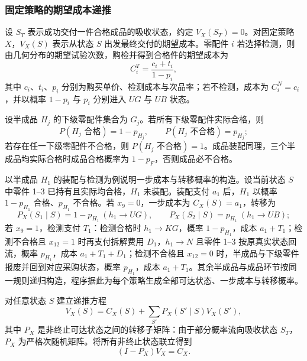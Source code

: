 \subsubsection{固定策略的期望成本递推}

设 $S_T$ 表示成功交付一件合格成品的吸收状态，约定 $V_X(S_T)=0$。对固定策略 $X$，$V_X(S)$ 表示从状态 $S$ 出发最终交付的期望成本。零配件 $i$ 若选择检测，则由几何分布的期望试验次数，购检并得到合格件的期望成本为
\begin{equation}
  C_i^{T}=\frac{c_i+t_i}{1-p_i},
  \label{eq:q3-buy-test}
\end{equation}
其中 $c_i$、$t_i$、$p_i$ 分别为购买单价、检测成本与次品率；若不检测，成本为 $C_i^{N}=c_i$，并以概率 $1-p_i$ 与 $p_i$ 分别进入 $UG$ 与 $UB$ 状态。

设半成品 $H_j$ 的下级零配件集合为 $G_j$。若所有下级零配件实际合格，则
\begin{equation}
  P(H_j\text{ 合格})=1-p_{H_j},\qquad
  P(H_j\text{ 不合格})=p_{H_j};
  \label{eq:q3-semi-quality}
\end{equation}
若存在任一下级零配件不合格，则 $P(H_j\text{ 不合格})=1$。成品装配同理，三个半成品均实际合格时成品合格概率为 $1-p_F$，否则成品必不合格。

以半成品 $H_1$ 的装配与检测为例说明一步成本与转移概率的构造。设当前状态 $S$ 中零件 1--3 已持有且实际均合格，$H_1$ 未装配。装配支付 $a_1$ 后，$H_1$ 以概率 $1-p_{H_1}$ 合格、$p_{H_1}$ 不合格。若 $x_9=0$，一步成本为 $C_X(S)=a_1$，转移为
\begin{equation}
  P_X(S_1\mid S)=1-p_{H_1}\ (h_1\to UG),\qquad
  P_X(S_2\mid S)=p_{H_1}\ (h_1\to UB);
  \label{eq:q3-example-notest}
\end{equation}
若 $x_9=1$，检测支付 $T_1$：检测合格时 $h_1\to KG$，概率 $1-p_{H_1}$，成本 $a_1+T_1$；检测不合格且 $x_{12}=1$ 时再支付拆解费用 $D_1$，$h_1\to N$ 且零件 1--3 按原真实状态回流，概率 $p_{H_1}$，成本 $a_1+T_1+D_1$；检测不合格且 $x_{12}=0$ 时，半成品与下级零件报废并回到对应采购状态，概率 $p_{H_1}$，成本 $a_1+T_1$。其余半成品与成品环节按同一规则递归构造，程序据此为每个策略生成全部可达状态、一步成本与转移概率。

对任意状态 $S$ 建立递推方程
\begin{equation}
  V_X(S)=C_X(S)+\sum_{S'}P_X(S'\mid S)V_X(S'),
  \label{eq:q3-value}
\end{equation}
其中 $P_X$ 是非终止可达状态之间的转移子矩阵：由于部分概率流向吸收状态 $S_T$，$P_X$ 为严格次随机矩阵。将所有非终止状态联立得到
\begin{equation}
  (I-P_X)V_X=C_X.
  \label{eq:q3-linear}
\end{equation}

